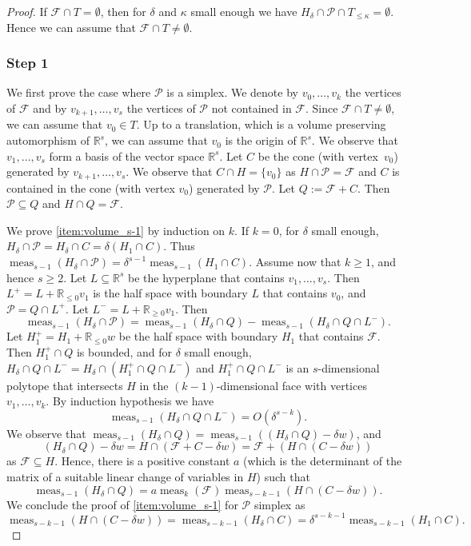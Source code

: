 \documentclass[11pt]{article}
\numberwithin{equation}{section}
\newcommand\RR{\mathbb{R}}
\DeclareMathOperator{\meas}{meas}
\theoremstyle{definition}
\numberwithin{theorem}{section}
\begin{document}
\begin{proof}
If $\mathcal F\cap T=\emptyset$,
then for $\delta$ and $\kappa$ small enough we have
$H_\delta \cap \mathcal P \cap T_{\leq\kappa}=\emptyset$.
Hence we can assume that $\mathcal F\cap T\neq\emptyset$.

\subsubsection*{Step 1}
We first prove the case where $\mathcal P$ is a simplex.
We denote by $v_0, \dots, v_k$
the vertices of $\mathcal F$ and by $v_{k+1},\dots, v_s$ the vertices of $\mathcal P$
not contained in $\mathcal F$. Since $\mathcal F\cap T\neq\emptyset$, we can assume that $v_0\in T$.
Up to a translation, which is a volume preserving automorphism of $\RR^s$,
we can assume that $v_0$ is the origin of $\RR^s$.
We observe that $v_1,\dots, v_s$ form a basis of the vector space $\RR^s$.
Let $C$ be the cone (with vertex~$v_0$) generated by $v_{k+1},\dots, v_s$.
We observe that $C\cap H=\{v_0\}$ as $H\cap \mathcal P=\mathcal F$ and $C$
is contained in the cone (with vertex $v_0$) generated by $\mathcal P$.
Let $Q:= \mathcal F+ C$. Then $\mathcal P\subseteq Q$ and $H\cap Q=\mathcal F$.

We prove \eqref{item:volume_s-1} by induction on $k$. If $k=0$,
for $\delta$ small enough, $H_\delta\cap\mathcal P=H_\delta\cap C=\delta(H_1\cap C)$.
Thus $\meas_{s-1}(H_\delta\cap\mathcal P)=\delta^{s-1}\meas_{s-1}(H_1\cap C)$.
Assume now that $k\geq 1$, and hence $s\geq 2$.
Let $L\subseteq \RR^s$ be the hyperplane that contains $v_1,\dots,v_s$.
Then $L^+=L+\RR_{\leq 0} v_1$ is the half space with boundary $L$ that contains $v_0$,
and $\mathcal P=Q\cap L^+$. Let $L^-=L+\RR_{\geq 0} v_1$.
Then
\[
\meas_{s-1}(H_\delta\cap\mathcal P)
=\meas_{s-1}(H_\delta\cap Q)-\meas_{s-1}(H_\delta\cap Q\cap L^-).
\]
Let $H_1^+=H_{1}+\RR_{\leq 0}w$ be the half space with boundary $H_1$ that contains $\mathcal F$.
Then $H_1^+\cap Q$ is bounded, and for $\delta$ small enough,
$H_\delta\cap Q\cap L^-=H_\delta\cap (H_1^+\cap Q\cap L^-)$
and $H_1^+\cap Q\cap L^-$ is an $s$-dimensional polytope that intersects $H$
in the $(k-1)$-dimensional face with vertices $v_1,\dots,v_k$.
By induction hypothesis we have
\begin{equation*}
\label{eq:volume:Qcap L^-}
\meas_{s-1}(H_\delta\cap Q\cap L^-)=O(\delta^{s-k}).
\end{equation*}
We observe that $\meas_{s-1}(H_\delta\cap Q)=\meas_{s-1}((H_\delta\cap Q)-\delta w)$, and
\[
(H_\delta\cap Q)-\delta w=H\cap (\mathcal F+C-\delta w)=\mathcal F+(H\cap (C-\delta w))
\]
as $\mathcal F\subseteq H$.
Hence, there is a positive constant $a$ (which is the determinant of the matrix of a
suitable linear change of variables in $H$) such that
\[
\meas_{s-1}(H_\delta\cap Q)=a\meas_k(\mathcal F)\meas_{s-k-1}(H\cap (C-\delta w)).
\]
We conclude the proof of \eqref{item:volume_s-1} for $\mathcal P$ simplex as
\[
\meas_{s-k-1}(H\cap (C-\delta w))
=\meas_{s-k-1}(H_\delta\cap C)=\delta^{s-k-1}\meas_{s-k-1}(H_1\cap C).
\]


\end{proof}
\end{document}
